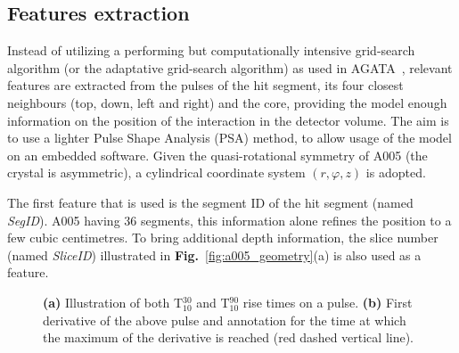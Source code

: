 \subsection{Features extraction}
\label{subsec:feature_extraction}

Instead of utilizing a performing but computationally intensive grid-search algorithm (or the adaptative grid-search algorithm) as used in AGATA~\cite{Venturelli2004}, relevant features are extracted from the pulses of the hit segment, its four closest neighbours (top, down, left and right) and the core, providing the model enough information on the position of the interaction in the detector volume. The aim is to use a lighter Pulse Shape Analysis (PSA) method, to allow usage of the model on an embedded software. Given the quasi-rotational symmetry of A005 (the crystal is asymmetric), a cylindrical coordinate system $(r, \varphi, z)$ is adopted.

The first feature that is used is the segment ID of the hit segment (named \textit{SegID}). A005 having 36 segments, this information alone refines the position to a few cubic centimetres. To bring additional depth information, the slice number (named \textit{SliceID}) illustrated in \textbf{Fig.}~\ref{fig:a005_geometry}(a) is also used as a feature.

\begin{figure}
\centering
{}
\caption{\textbf{(a)} Illustration of both T$^{30}_{10}$ and T$^{90}_{10}$ rise times on a pulse. \textbf{(b)} First derivative of the above pulse and annotation for the time at which the maximum of the derivative is reached (red dashed vertical line).}
\label{fig:pulse_t30_t90}
\end{figure}

